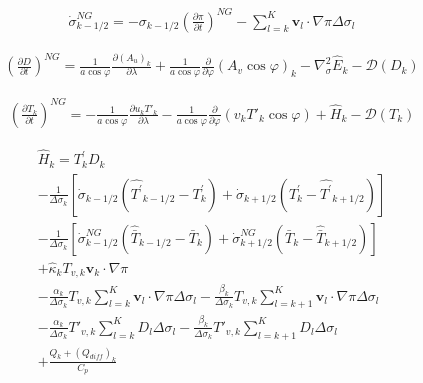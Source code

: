 \begin{eqnarray}
  \dot{\sigma}^{NG}_{k-1/2}
 = - \sigma_{k-1/2} \left( \frac{\partial \pi}{\partial t} \right)^{NG}
   - \sum_{l=k}^{K} \mathbf{v}_{l} \cdot \nabla \pi
       \Delta  \sigma_{l}
\end{eqnarray}

\begin{eqnarray}
  \left( \frac{\partial D}{\partial t} \right)^{NG}
       =   \frac{1}{a\cos\varphi}
            \frac{\partial (A_u)_{k}}{\partial \lambda}
          + \frac{1}{a\cos\varphi}
            \frac{\partial }{\partial \varphi} (A_v \cos\varphi)_k
          - \nabla^{2}_{\sigma} \hat{E}_{k} 
          - {\mathcal D}(D_{k}) 
\end{eqnarray}

\begin{eqnarray}
  \left( \frac{\partial T_{k}}{\partial t} \right)^{NG} 
      =   - \frac{1}{a\cos\varphi} 
               \frac{\partial u_k T'_k}{\partial \lambda}
          - \frac{1}{a\cos\varphi}
               \frac{\partial }{\partial \varphi} (v_k T'_k \cos\varphi)
          + \hat{H}_{k} 
          - {\mathcal D}(T_{k}) 
\end{eqnarray}

\begin{eqnarray}
 \hat{H}_k  =  T_{k}^{\prime} D_{k}  \\
         - \frac{1}{\Delta \sigma_{k}} 
             [   \dot{\sigma}_{k-1/2} ( \hat{T^{\prime}}_{k-1/2} 
                                         - T^{\prime}_{k}   )
               + \dot{\sigma}_{k+1/2} ( T^{\prime}_{k}  
                                         - \hat{T^{\prime}}_{k+1/2} ) ]
                \\
         - \frac{1}{\Delta \sigma_{k}} 
             [   \dot{\sigma}^{NG}_{k-1/2} ( \hat{\bar{T}}_{k-1/2} 
                                         - \bar{T}_{k}   )
               + \dot{\sigma}^{NG}_{k+1/2} ( \bar{T}_{k}  
                                         - \hat{\bar{T}}_{k+1/2} ) ]
                \\
         + \hat{\kappa}_{k} T_{v,k} \mathbf{v}_{k} \cdot \nabla \pi
                \\
         - \frac{\alpha_{k}}{\Delta \sigma_{k} } T_{v,k}
             \sum_{l=k}^{K} \mathbf{v}_{l} \cdot \nabla \pi 
               \Delta \sigma_{l}
           - \frac{\beta_{k}}{\Delta \sigma_{k} } T_{v,k}
             \sum_{l=k+1}^{K} \mathbf{v}_{l} \cdot \nabla \pi 
               \Delta \sigma_{l}
                \\
         - \frac{\alpha_{k}}{\Delta \sigma_{k} } T'_{v,k}
             \sum_{l=k}^{K} D_l  \Delta \sigma_{l}
           - \frac{\beta_{k}}{\Delta \sigma_{k} } T'_{v,k}
             \sum_{l=k+1}^{K} D_l  \Delta \sigma_{l}
                \\
         + \frac{Q_k + (Q_{diff})_k}{C_p}
\end{eqnarray}

